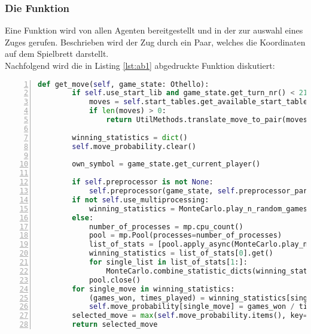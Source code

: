 \subsubsection{Die Funktion }
Eine Funktion  wird von allen Agenten bereitgestellt und in der  zur auswahl eines Zuges gerufen. Beschrieben wird der Zug durch ein Paar, welches die Koordinaten auf dem Spielbrett darstellt.
\\Nachfolgend wird die in Listing \ref{lst:ab1} abgedruckte Funktion diskutiert:
\vspace{0.5cm}

\begin{lstlisting}[caption = {get\_move Funktion des Monte-Carlo Agenten}, language = python, captionpos = t , numbers=left, label={lst:ab1}]
    def get_move(self, game_state: Othello):
        if self.use_start_lib and game_state.get_turn_nr() < 21: 
            moves = self.start_tables.get_available_start_tables(game_state)
            if len(moves) > 0:
                return UtilMethods.translate_move_to_pair(moves[random.randrange(len(moves))])

        winning_statistics = dict()
        self.move_probability.clear()

        own_symbol = game_state.get_current_player()

        if self.preprocessor is not None:
            self.preprocessor(game_state, self.preprocessor_parameter, self.heuristic)
        if not self.use_multiprocessing:
            winning_statistics = MonteCarlo.play_n_random_games(own_symbol, game_state, self.big_n)
        else:
            number_of_processes = mp.cpu_count()
            pool = mp.Pool(processes=number_of_processes)
            list_of_stats = [pool.apply_async(MonteCarlo.play_n_random_games, args=(own_symbol, game_state.deepcopy(), self.big_n // number_of_processes)) for _ in range(number_of_processes)]
            winning_statistics = list_of_stats[0].get()
            for single_list in list_of_stats[1:]:
                MonteCarlo.combine_statistic_dicts(winning_statistics, single_list.get())
            pool.close()
        for single_move in winning_statistics:
            (games_won, times_played) = winning_statistics[single_move]
            self.move_probability[single_move] = games_won / times_played
        selected_move = max(self.move_probability.items(), key=operator.itemgetter(1))[0]
        return selected_move
\end{lstlisting}

